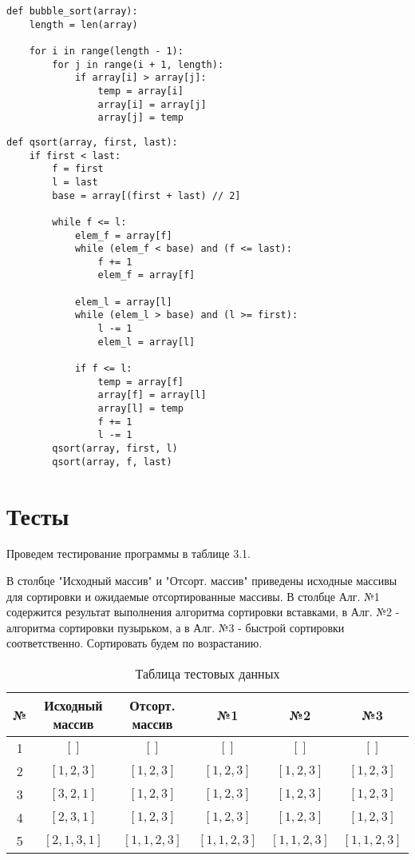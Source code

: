 \begin{lstlisting}[label=some-code,caption=Алгоритм сортировки пузырьком]
def bubble_sort(array):
	length = len(array)
	
	for i in range(length - 1):
		for j in range(i + 1, length):
			if array[i] > array[j]:
				temp = array[i]
				array[i] = array[j]
				array[j] = temp 
\end{lstlisting}


\begin{lstlisting}[label=some-code,caption=Алгоритм быстрой сортировки]
def qsort(array, first, last):
	if first < last:
		f = first
		l = last
		base = array[(first + last) // 2]
		
		while f <= l:
			elem_f = array[f]
			while (elem_f < base) and (f <= last):
				f += 1
				elem_f = array[f]
			
			elem_l = array[l]
			while (elem_l > base) and (l >= first):
				l -= 1
				elem_l = array[l]
			
			if f <= l:
				temp = array[f]
				array[f] = array[l]
				array[l] = temp
				f += 1
				l -= 1
		qsort(array, first, l)
		qsort(array, f, last)
\end{lstlisting}


\section{Тесты}


\par
Проведем тестирование программы в таблице 3.1.

В столбце "Исходный массив" и "Отсорт. массив" приведены исходные массивы для сортировки и ожидаемые отсортированные массивы. В столбце Алг. №1 содержится результат выполнения алгоритма сортировки вставками, в Алг. №2 - алгоритма сортировки пузырьком, а в Алг. №3 - быстрой сортировки соответственно. Сортировать будем по возрастанию.


\begin{table}[h!]
	\centering
	\caption{Таблица тестовых данных}
	\begin{tabular}{|c c c c c c|} 
		\hline
		№ & Исходный массив & Отсорт. массив & №1 & №2 & №3 \\ [0.8ex] 
		\hline
		1 & $[ ]$ & $[ ]$ & $[ ]$ &  $[ ]$ & $[ ]$ \\
		\hline
		2 & $[1, 2, 3]$ & $[1, 2, 3]$ & $[1, 2, 3]$ &  $[1, 2, 3]$ & $[1, 2, 3]$ \\
		\hline
		3 & $[3, 2, 1]$ & $[1, 2, 3]$ & $[1, 2, 3]$ &  $[1, 2, 3]$ & $[1, 2, 3]$ \\
		\hline
		4 & $[2, 3, 1]$ & $[1, 2, 3]$ & $[1, 2, 3]$ &  $[1, 2, 3]$ & $[1, 2, 3]$ \\
		\hline
		5 & $[2, 1, 3, 1]$ & $[1, 1, 2, 3]$ & $[1, 1, 2, 3]$ &  $[1, 1, 2, 3]$ & $[1, 1, 2, 3]$ \\
		\hline
	\end{tabular}
\end{table}


